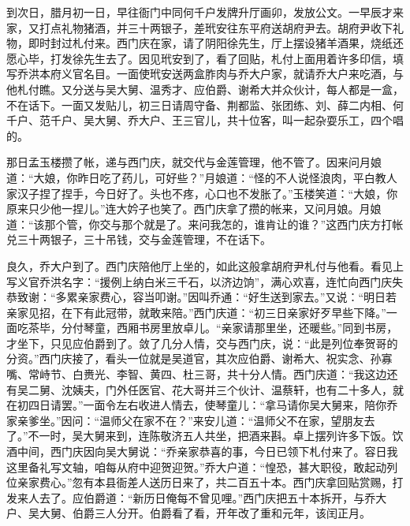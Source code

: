 到次日，腊月初一日，早往衙门中同何千户发牌升厅画卯，发放公文。一早辰才来家，又打点礼物猪酒，并三十两银子，差玳安往东平府送胡府尹去。胡府尹收下礼物，即时封过札付来。西门庆在家，请了阴阳徐先生，厅上摆设猪羊酒果，烧纸还愿心毕，打发徐先生去了。因见玳安到了，看了回贴，札付上面用着许多印信，填写乔洪本府义官名目。一面使玳安送两盒胙肉与乔大户家，就请乔大户来吃酒，与他札付瞧。又分送与吴大舅、温秀才、应伯爵、谢希大并众伙计，每人都是一盒，不在话下。一面又发贴儿，初三日请周守备、荆都监、张团练、刘、薛二内相、何千户、范千户、吴大舅、乔大户、王三官儿，共十位客，叫一起杂耍乐工，四个唱的。

那日孟玉楼攒了帐，递与西门庆，就交代与金莲管理，他不管了。因来问月娘道：“大娘，你昨日吃了药儿，可好些？”月娘道：“怪的不人说怪浪肉，平白教人家汉子捏了捏手，今日好了。头也不疼，心口也不发胀了。”玉楼笑道：“大娘，你原来只少他一捏儿。”连大妗子也笑了。西门庆拿了攒的帐来，又问月娘。月娘道：“该那个管，你交与那个就是了。来问我怎的，谁肯让的谁？”这西门庆方打帐兑三十两银子，三十吊钱，交与金莲管理，不在话下。

良久，乔大户到了。西门庆陪他厅上坐的，如此这般拿胡府尹札付与他看。看见上写义官乔洪名字：“援例上纳白米三千石，以济边饷”，满心欢喜，连忙向西门庆失恭致谢：“多累亲家费心，容当叩谢。”因叫乔通：“好生送到家去。”又说：“明日若亲家见招，在下有此冠带，就敢来陪。”西门庆道：“初三日亲家好歹早些下降。”一面吃茶毕，分付琴童，西厢书房里放卓儿。“亲家请那里坐，还暖些。”同到书房，才坐下，只见应伯爵到了。敛了几分人情，交与西门庆，说：“此是列位奉贺哥的分资。”西门庆接了，看头一位就是吴道官，其次应伯爵、谢希大、祝实念、孙寡嘴、常峙节、白赉光、李智、黄四、杜三哥，共十分人情。西门庆道：“我这边还有吴二舅、沈姨夫，门外任医官、花大哥并三个伙计、温蔡轩，也有二十多人，就在初四日请罢。”一面令左右收进人情去，使琴童儿：“拿马请你吴大舅来，陪你乔家亲爹坐。”因问：“温师父在家不在？”来安儿道：“温师父不在家，望朋友去了。”不一时，吴大舅来到，连陈敬济五人共坐，把酒来斟。卓上摆列许多下饭。饮酒中间，西门庆因向吴大舅说：“乔亲家恭喜的事，今日已领下札付来了。容日我这里备礼写文轴，咱每从府中迎贺迎贺。”乔大户道：“惶恐，甚大职役，敢起动列位亲家费心。”忽有本县衙差人送历日来了，共二百五十本。西门庆拿回贴赏赐，打发来人去了。应伯爵道：“新历日俺每不曾见哩。”西门庆把五十本拆开，与乔大户、吴大舅、伯爵三人分开。伯爵看了看，开年改了重和元年，该闰正月。

